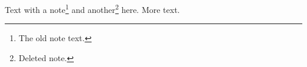 \documentclass{article}
\begin{document}
Text with a note\footnote{The old note text.} and another\footnote{Deleted note.} here.
More text.
\end{document}
